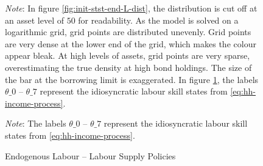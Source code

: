 \documentclass[a4paper,12pt]{article} %
\numberwithin{equation}{section} %
\numberwithin{figure}{section}
\numberwithin{table}{section}
\begin{document}
\begin{refsection}
\begin{appendices}
\begin{figure}[H]
    \vspace{10pt}
     
     \justifying
     \footnotesize
	\textit{Note}: In figure \ref{fig:init-stst-end-L-dist}, the distribution is cut off at an asset level of $50$ for readability. As the model is solved on a logarithmic grid, grid points are distributed unevenly. Grid points are very dense at the lower end of the grid, which makes the colour appear bleak. At high levels of assets, grid points are very sparse, overestimating the true density at high bond holdings. The size of the bar at the borrowing limit is exaggerated. In figure \ref{fig:init-stst-end-L-pol-n}, the labels $\theta\_0$ -- $\theta\_7$ represent the idiosyncratic labour skill states from \eqref{eq:hh-income-process}.
\end{figure}

\begin{figure}[H]
    \centering
    \caption{Endogenous Labour -- Labour Supply Policies}
    \label{fig:init-stst-end-L-pol-n}
    

    \vspace{10pt}
    
    \begin{minipage}{0.75\textwidth}
    \footnotesize
    \textit{Note}: The labels $\theta\_0$ -- $\theta\_7$ represent the idiosyncratic labour skill states from \eqref{eq:hh-income-process}.
    \end{minipage}
\end{figure}


\end{appendices}
\end{refsection}
\end{document}
